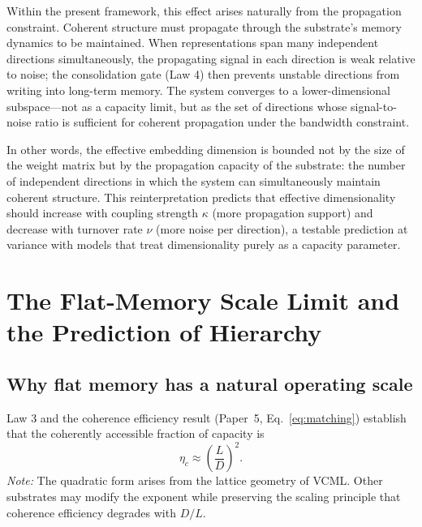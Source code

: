 \documentclass[12pt]{article}
\begin{document}
Within the present framework, this effect arises naturally from the propagation constraint. Coherent structure must propagate through the substrate's memory dynamics to be maintained. When representations span many independent directions simultaneously, the propagating signal in each direction is weak relative to noise; the consolidation gate (Law 4) then prevents unstable directions from writing into long-term memory. The system converges to a lower-dimensional subspace---not as a capacity limit, but as the set of directions whose signal-to-noise ratio is sufficient for coherent propagation under the bandwidth constraint.

In other words, the effective embedding dimension is bounded not by the size of the weight matrix but by the propagation capacity of the substrate: the number of independent directions in which the system can simultaneously maintain coherent structure. This reinterpretation predicts that effective dimensionality should increase with coupling strength $\kappa$ (more propagation support) and decrease with turnover rate $\nu$ (more noise per direction), a testable prediction at variance with models that treat dimensionality purely as a capacity parameter.

\section{The Flat-Memory Scale Limit and the Prediction of Hierarchy}
\label{sec:scaling}

\subsection{Why flat memory has a natural operating scale}

Law 3 and the coherence efficiency result (Paper~5, Eq.~\ref{eq:matching}) establish that the coherently accessible fraction of capacity is
\begin{equation}
  \eta_c \approx \left(\frac{L}{D}\right)^2.
  \label{eq:etac}
\end{equation}
\textit{Note:} The quadratic form arises from the lattice geometry of VCML. Other substrates may modify the exponent while preserving the scaling principle that coherence efficiency degrades with $D/L$.
\end{document}
